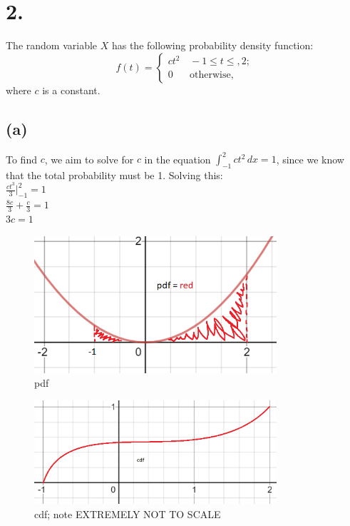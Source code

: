 \documentclass{article}
\begin{document}
\thispagestyle{firstpageheader}

\section*{2.}
{\Large
The random variable $X$ has the following probability density function:
\[
f\left(t\right)=\begin{cases}
ct^{2} & \,-1\le t\le,2;\\
0 & \,\mbox{otherwise,}
\end{cases}
\]
where $c$ is a constant.

\subsection*{(a)}
To find $c$, we aim to solve for $c$ in the equation $\int_{-1}^{2}  ct^2\,dx = 1$, since we know that the total probability must be 1. Solving this: \\ 
$\frac{ct^3}{3}|_{-1}^{2} = 1$ \\ 
$\frac{8c}{3} + \frac{c}{3} = 1$ \\ 
$3c = 1$ \\ 

\begin{figure}[ht!]
  \centering
  \includegraphics[width=90mm]{pdf.PNG}
  \caption{pdf \label{overflow}}
\end{figure}

\begin{figure}[ht!]
  \centering
  \includegraphics[width=90mm]{cdf.PNG}
  \caption{cdf; note EXTREMELY NOT TO SCALE \label{overflow}}
\end{figure}

}
\end{document}
